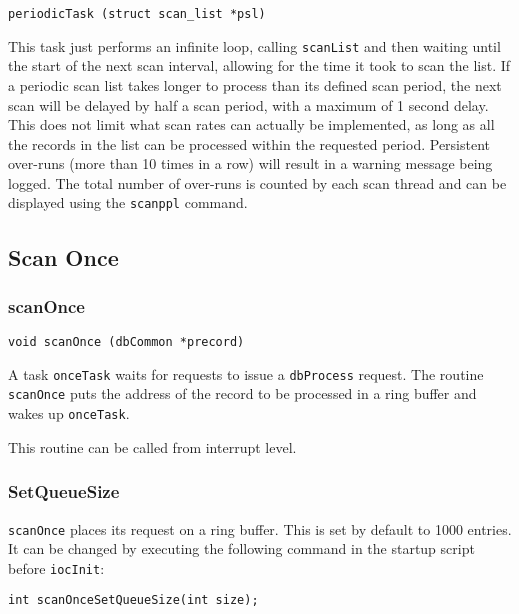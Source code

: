 \begin{verbatim}
periodicTask (struct scan_list *psl)
\end{verbatim}

This task just performs an infinite loop, calling \verb|scanList| and then waiting until the start of the next scan interval, allowing for the time it took to scan the list.
If a periodic scan list takes longer to process than its defined scan period, the next scan will be delayed by half a scan period, with a maximum of 1 second delay.
This does not limit what scan rates can actually be implemented, as long as all the records in the list can be processed within the requested period.
Persistent over-runs (more than 10 times in a row) will result in a warning message being logged.
The total number of over-runs is counted by each scan thread and can be displayed using the \verb|scanppl| command.

\subsection{Scan Once}

\subsubsection{scanOnce}

\begin{verbatim}
void scanOnce (dbCommon *precord)
\end{verbatim}

A task \verb|onceTask| waits for requests to issue a \verb|dbProcess| request.
The routine \verb|scanOnce| puts the address of the record to be processed in a ring buffer and wakes up \verb|onceTask|.

This routine can be called from interrupt level.

\subsubsection{SetQueueSize}

\verb|scanOnce| places its request on a ring buffer.
This is set by default to 1000 entries.
It can be changed by executing the following command in the startup script before \verb|iocInit|:

\begin{verbatim}
int scanOnceSetQueueSize(int size);
\end{verbatim}



